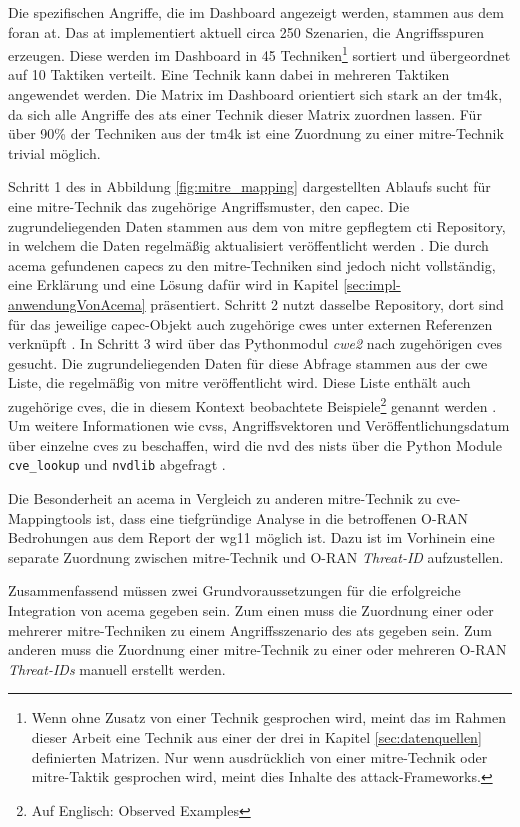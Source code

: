 \par Die spezifischen Angriffe, die im Dashboard angezeigt werden, stammen aus dem \gls{foran} \gls{at}. Das \gls{at} implementiert aktuell circa 250 Szenarien, die Angriffsspuren erzeugen. Diese werden im Dashboard in 45 Techniken\footnote{Wenn ohne Zusatz von einer Technik gesprochen wird, meint das im Rahmen dieser Arbeit eine Technik aus einer der drei in Kapitel \ref{sec:datenquellen} definierten Matrizen. Nur wenn ausdrücklich von einer \gls{mitre}-Technik oder \gls{mitre}-Taktik gesprochen wird, meint dies Inhalte des \gls{attack}-Frameworks.} sortiert und übergeordnet auf 10 Taktiken verteilt. Eine Technik kann dabei in mehreren Taktiken angewendet werden. Die Matrix im Dashboard orientiert sich stark an der \gls{tm4k}, da sich alle Angriffe des \gls{at}s einer Technik dieser Matrix zuordnen lassen. Für über 90\% der Techniken aus der \gls{tm4k} ist eine Zuordnung zu einer \gls{mitre}-Technik trivial möglich.
\par Schritt 1 des in Abbildung \ref{fig:mitre_mapping} dargestellten Ablaufs sucht für eine \gls{mitre}-Technik das zugehörige Angriffsmuster, den \gls{capec}. Die zugrundeliegenden Daten stammen aus dem von \gls{mitre} gepflegtem \gls{cti} Repository, in welchem die Daten regelmäßig aktualisiert veröffentlicht werden \autocite{MitreCtiCyber}. Die durch \gls{acema} gefundenen \glspl{capec} zu den \gls{mitre}-Techniken sind jedoch nicht vollständig, eine Erklärung und eine Lösung dafür wird in Kapitel \ref{sec:impl-anwendungVonAcema} präsentiert. Schritt 2 nutzt dasselbe Repository, dort sind für das jeweilige \gls{capec}-Objekt auch zugehörige \glspl{cwe} unter externen Referenzen verknüpft \autocite{CtiUSAGEmdMaster}. In Schritt 3 wird über das Pythonmodul \textit{cwe2} nach zugehörigen \glspl{cve} gesucht. Die zugrundeliegenden Daten für diese Abfrage stammen aus der \gls{cwe} Liste, die regelmäßig von \gls{mitre} veröffentlicht wird. Diese Liste enthält auch zugehörige \glspl{cve}, die in diesem Kontext \glqq{}beobachtete Beispiele\grqq{}\footnote{Auf Englisch: \glqq{}Observed Examples\grqq} genannt werden \autocite{AboutcodeorgCwe22024,CWEDownloads}. Um weitere Informationen wie \gls{cvss}, Angriffsvektoren und Veröffentlichungsdatum über einzelne \glspl{cve} zu beschaffen, wird die \gls{nvd} des \gls{nist}s über die Python Module \verb|cve_lookup| und \verb|nvdlib| abgefragt \autocite{NVDLibNVDLibNIST,MachineThingCve_lookupLook,NVDHome}.
\par Die Besonderheit an \gls{acema} in Vergleich zu anderen \gls{mitre}-Technik zu \gls{cve}-Mappingtools ist, dass eine tiefgründige Analyse in die betroffenen O-RAN Bedrohungen aus dem Report der \gls{wg11} möglich ist. Dazu ist im Vorhinein eine separate Zuordnung zwischen \gls{mitre}-Technik und O-RAN \textit{Threat-ID} aufzustellen.
\par Zusammenfassend müssen zwei Grundvoraussetzungen für die erfolgreiche Integration von \gls{acema} gegeben sein. Zum einen muss die Zuordnung einer oder mehrerer \gls{mitre}-Techniken zu einem Angriffsszenario des \gls{at}s gegeben sein. Zum anderen muss die Zuordnung einer \gls{mitre}-Technik zu einer oder mehreren O-RAN \textit{Threat-IDs} manuell erstellt werden.

